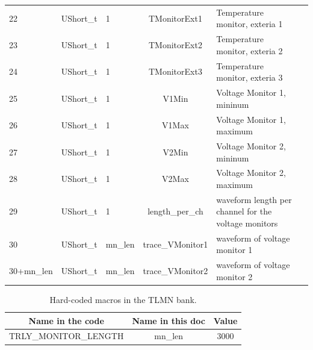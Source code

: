 \begin{table}[htbp]
\begin{tabular}{|p{2cm}|c|p{1.5cm}|c|p{4cm}|c|}
\cline{1-5}
22               & UShort\_t  & 1            & TMonitorExt1             & Temperature monitor, exteria 1                         &                             \\
\cline{1-5}
23               & UShort\_t  & 1            & TMonitorExt2             & Temperature monitor, exteria 2                         &                             \\
\cline{1-5}
24               & UShort\_t  & 1            & TMonitorExt3             & Temperature monitor, exteria 3                         &                             \\
\cline{1-5}
25               & UShort\_t  & 1            & V1Min                    & Voltage Monitor 1, mininum                             &                             \\
\cline{1-5}
26               & UShort\_t  & 1            & V1Max                    & Voltage Monitor 1, maximum                             &                             \\
\cline{1-5}
27               & UShort\_t  & 1            & V2Min                    & Voltage Monitor 2, mininum                             &                             \\
\cline{1-5}
28               & UShort\_t  & 1            & V2Max                    & Voltage Monitor 2, maximum                             &                             \\
\cline{1-5}
29               & UShort\_t  & 1            & length\_per\_ch          & waveform length per channel for the voltage monitors   &                             \\
\cline{1-5}
30               & UShort\_t  & mn\_len      & trace\_VMonitor1         & waveform of voltage monitor 1                          &                             \\
\cline{1-5}
30+mn\_len       & UShort\_t  & mn\_len      & trace\_VMonitor2         & waveform of voltage monitor 2                         &     \\
\hline
\end{tabular} 
\label{tab:tlmntable}
\end{table}


\begin{table}[htbp]
\centering
\caption{Hard-coded macros in the TLMN bank.}
\begin{tabular}{|c|c|c|}
\hline
Name in the code	& Name in this doc & Value \\
\hline
TRLY\_MONITOR\_LENGTH & mn\_len & 3000 \\
\hline
\end{tabular} 
\label{tab:tlmnmacro}
\end{table}



